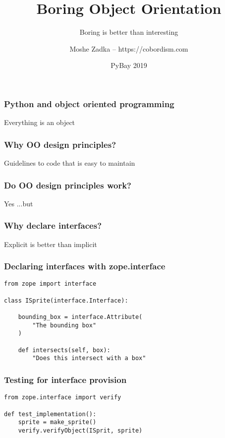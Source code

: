 \usepackage{listings}
\usepackage{textcomp}
\usepackage{fancyvrb}

\title{Boring Object Orientation}
\subtitle{Boring is better than interesting}
\author{Moshe Zadka -- https://cobordism.com}
\date{PyBay 2019}


\begin{titlepage}
\maketitle
\end{titlepage}

\frame{\titlepage}

\begin{frame}[fragile]
\frametitle{Python and object oriented programming}

Everything is an object
\end{frame}

\begin{frame}[fragile]
\frametitle{Why OO design principles?}

Guidelines to code that is easy to maintain
\end{frame}

\begin{frame}[fragile]
\frametitle{Do OO design principles work?}

Yes
\pause
...but
\end{frame}

\begin{frame}[fragile]
\frametitle{Why declare interfaces?}

Explicit is better than implicit
\end{frame}

\begin{frame}[fragile]
\frametitle{Declaring interfaces with zope.interface}

\begin{lstlisting}
from zope import interface

class ISprite(interface.Interface):

    bounding_box = interface.Attribute(
        "The bounding box"
    )

    def intersects(self, box):
        "Does this intersect with a box"
\end{lstlisting}

\end{frame}

\begin{frame}[fragile]
\frametitle{Testing for interface provision}

\begin{lstlisting}
from zope.interface import verify

def test_implementation():
    sprite = make_sprite()
    verify.verifyObject(ISprit, sprite)
\end{lstlisting}

\end{frame}

